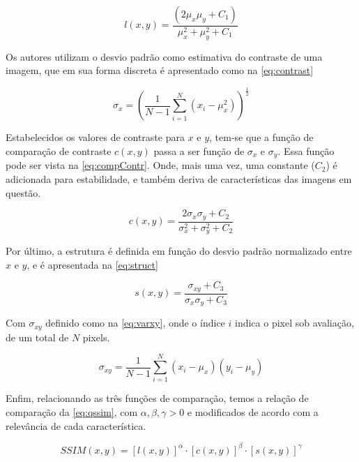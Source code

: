 \begin{equation}\label{eq:compLum}
	l(x,y) = \frac{(2\mu_x\mu_y + C_1)}{\mu^{2}_{x} + \mu^{2}_{y} + C_1}
\end{equation}

Os autores utilizam o desvio padrão como estimativa do contraste de uma imagem, que em sua forma discreta é apresentado como na \autoref*{eq:contrast}

\begin{equation}\label{eq:contrast}
	\sigma_x = \left(\frac{1}{N-1}\sum^{N}_{i=1}(x_i - \mu_x^2) \right)^\frac{1}{2}
\end{equation}

Estabelecidos os valores de contraste para $x$ e $y$, tem-se que a função de comparação de contraste $c(x,y)$ passa a ser função de $\sigma_x$ e $\sigma_y$. Essa função pode ser vista na \autoref*{eq:compContr}. Onde, mais uma vez, uma constante ($C_2$) é adicionada para estabilidade, e também deriva de características das imagens em questão.

\begin{equation}\label{eq:compContr}
	c(x,y) = \frac{2\sigma_x\sigma_y + C_2}{\sigma^{2}_x + \sigma^2_y + C_2}
\end{equation}


Por último, a estrutura é definida em função do desvio padrão normalizado entre $x$ e $y$, e é apresentada na \autoref*{eq:struct}

\begin{equation}\label{eq:struct}
	s(x,y) = \frac{\sigma_{xy} + C_3}{\sigma_x \sigma_y + C_3}
\end{equation}

Com $\sigma_{xy}$ definido como na \autoref*{eq:varxy}, onde o índice $i$ indica o pixel sob avaliação, de um total de $N$ pixels.

\begin{equation}\label{eq:varxy}
	\sigma_{xy} = \frac{1}{N-1}\sum^{N}_{i=1}(x_i - \mu_x)(y_i - \mu_y)
\end{equation}

Enfim, relacionando as três funções de comparação, temos a relação de comparação da \autoref*{eq:qssim}, com $\alpha, \beta, \gamma > 0$ e modificados de acordo com a relevância de cada característica.

\begin{equation}\label{eq:qssim}
	SSIM(x,y) = [l(x,y)]^{\alpha} \cdot [c(x,y)]^{\beta} \cdot [s(x,y)]^{\gamma}
\end{equation}

